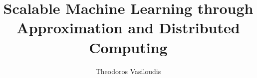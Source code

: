 


\title{Scalable Machine Learning through Approximation and Distributed Computing}
\author{Theodoros Vasiloudis}


\dedication{
  To my parents
}


